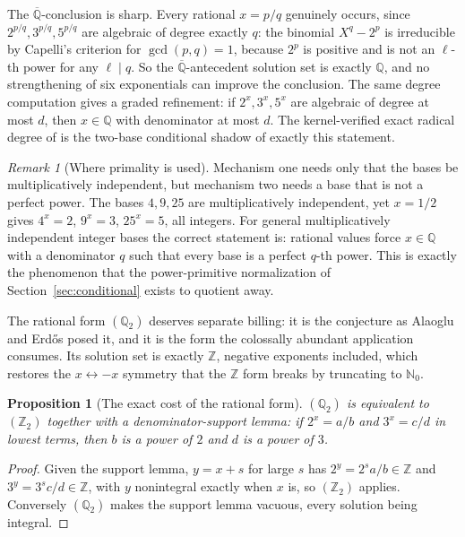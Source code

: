 \documentclass[11pt,oneside]{article}
\newtheorem{proposition}[theorem]{Proposition}
\theoremstyle{definition}
\theoremstyle{remark}
\newtheorem{remark}[theorem]{Remark}
\newcommand{\Nzero}{\mathbb N_0}
\newcommand{\Z}{\mathbb Z}
\newcommand{\Q}{\mathbb Q}
\newcommand{\Abar}{\overline{\mathbb Q}}
\newcommand{\Qbar}{\Abar}
\newcommand{\lean}[1]{\texttt{\detokenize{#1}}}
\begin{document}
The $\Qbar$-conclusion is sharp.  Every rational $x=p/q$ genuinely occurs, since
$2^{p/q},3^{p/q},5^{p/q}$ are algebraic of degree exactly $q$: the binomial $X^q-2^p$ is
irreducible by Capelli's criterion for $\gcd(p,q)=1$, because $2^p$ is positive and is not an
$\ell$-th power for any $\ell\mid q$.  So the $\Qbar$-antecedent solution set is exactly $\Q$,
and no strengthening of six exponentials can improve the conclusion.  The same degree
computation gives a graded refinement: if $2^x,3^x,5^x$ are algebraic of degree at most $d$,
then $x\in\Q$ with denominator at most $d$.  The kernel-verified exact radical degree of
\lean{RadicalDegree} is the two-base conditional shadow of exactly this statement.

\begin{remark}[Where primality is used]
Mechanism one needs only that the bases be multiplicatively independent, but mechanism two
needs a base that is not a perfect power.  The bases $4,9,25$ are multiplicatively independent,
yet $x=1/2$ gives $4^x=2$, $9^x=3$, $25^x=5$, all integers.  For general multiplicatively
independent integer bases the correct statement is: rational values force $x\in\Q$ with a
denominator $q$ such that every base is a perfect $q$-th power.  This is exactly the phenomenon
that the power-primitive normalization of Section~\ref{sec:conditional} exists to quotient
away.
\end{remark}

The rational form $(\Q_2)$ deserves separate billing: it is the conjecture as Alaoglu and
Erd\H{o}s posed it, and it is the form the colossally abundant application consumes.  Its
solution set is exactly $\Z$, negative exponents included, which restores the $x\leftrightarrow
-x$ symmetry that the $\Z$ form breaks by truncating to $\Nzero$.

\begin{proposition}[The exact cost of the rational form]
\label{va:prop-rational-cost}
$(\Q_2)$ is equivalent to $(\Z_2)$ together with a denominator-support lemma: if $2^x=a/b$ and
$3^x=c/d$ in lowest terms, then $b$ is a power of $2$ and $d$ is a power of $3$.
\end{proposition}

\begin{proof}
Given the support lemma, $y=x+s$ for large $s$ has $2^y=2^sa/b\in\Z$ and $3^y=3^sc/d\in\Z$,
with $y$ nonintegral exactly when $x$ is, so $(\Z_2)$ applies.  Conversely $(\Q_2)$ makes the
support lemma vacuous, every solution being integral.
\end{proof}
\end{document}

